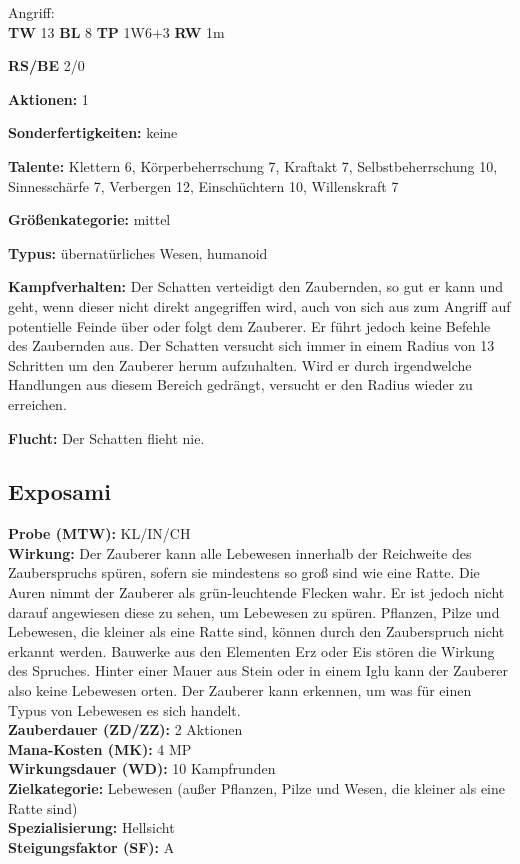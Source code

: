 Angriff: \\
\textbf{TW} 13 \textbf{BL} 8 \textbf{TP} 1W6+3 \textbf{RW} 1m

\textbf{RS/BE} 2/0

\textbf{Aktionen:} 1

\textbf{Sonderfertigkeiten:} keine

\textbf{Talente:} Klettern 6, Körperbeherrschung 7, Kraftakt 7, Selbstbeherrschung 10, Sinnesschärfe 7, Verbergen 12, Einschüchtern 10, Willenskraft 7

\textbf{Größenkategorie:} mittel

\textbf{Typus:} übernatürliches Wesen, humanoid

\textbf{Kampfverhalten:} Der Schatten verteidigt den Zaubernden, so gut er kann und geht, wenn dieser nicht direkt angegriffen wird, auch von sich aus zum Angriff auf potentielle Feinde über oder folgt dem Zauberer. Er führt jedoch keine Befehle des Zaubernden aus. Der Schatten versucht sich immer in einem Radius von 13 Schritten um den Zauberer herum aufzuhalten. Wird er durch irgendwelche Handlungen aus diesem Bereich gedrängt, versucht er den Radius wieder zu erreichen.

\textbf{Flucht:} Der Schatten flieht nie.


\subsection{Exposami}
\label{chap:exposami}
\textbf{Probe (MTW):} KL/IN/CH \\
\textbf{Wirkung:} Der Zauberer kann alle Lebewesen innerhalb der Reichweite des Zauberspruchs spüren, sofern sie mindestens so groß sind wie eine Ratte. Die Auren nimmt der Zauberer als grün-leuchtende Flecken wahr. Er ist jedoch nicht darauf angewiesen diese zu sehen, um Lebewesen zu spüren. Pflanzen, Pilze und Lebewesen, die kleiner als eine Ratte sind, können durch den Zauberspruch nicht erkannt werden. Bauwerke aus den Elementen Erz oder Eis stören die Wirkung des Spruches. Hinter einer Mauer aus Stein oder in einem Iglu kann der Zauberer also keine Lebewesen orten. Der Zauberer kann erkennen, um was für einen Typus von Lebewesen es sich handelt.\\
\textbf{Zauberdauer (ZD/ZZ):} 2 Aktionen \\
\textbf{Mana-Kosten (MK):} 4 MP \\
\textbf{Wirkungsdauer (WD):} 10 Kampfrunden \\
\textbf{Zielkategorie:} Lebewesen (außer Pflanzen, Pilze und Wesen, die kleiner als eine Ratte sind) \\
\textbf{Spezialisierung:} Hellsicht \\
\textbf{Steigungsfaktor (SF):} A


